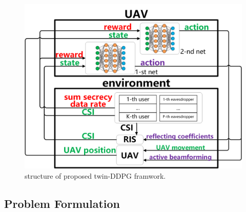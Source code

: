 \documentclass[journal]{IEEEtran}
\begin{document}

\begin{figure}[t]
	\centering
	\includegraphics[width=1.0\linewidth]{./plot/construction/construction.png}%
	\caption{structure of proposed twin-DDPG framwork.}  \label{structure}
\end{figure}
\subsection{Problem Formulation}
\end{document}
